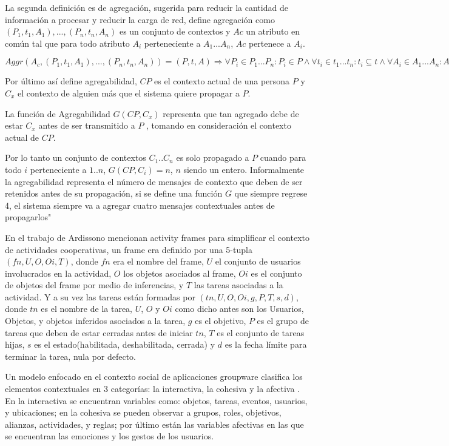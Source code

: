 La segunda definici\'on es de agregaci\'on, sugerida para reducir la cantidad de informaci\'on a procesar y reducir la carga de red, define agregaci\'on como ${ ( P_{1},t_{1},A_{1} ),..., ( P_{n},t_{n},A_{n} ) }$ es un conjunto de contextos y $Ac$ un atributo en com\'un tal que para todo atributo $A_{i}$ perteneciente a $A_{1} ... A_{n}$, $Ac$ pertenece a $A_{i}$.

$Aggr( A_{c}, {( P_{1},t_{1},A_{1} ),..., ( P_{n},t_{n},A_{n} )}) = ( P, t, A )\Rightarrow \forall P_{i}\in P_{1}...P_{n}:P_{i}\in P \wedge \forall t_{i} \in t_{1}...t_{n}:t_{i}\subseteq t \wedge \forall A_{i}\in A_{1}...A_{n}:A_{i}\in A$

Por \'ultimo as\'i define agregabilidad, $CP$ es el contexto actual de una persona $P$ y $C_{x}$ el contexto de alguien m\'as que el sistema quiere propagar a $P$.

La funci\'on de Agregabilidad $G( CP, C_{x} )$ representa que tan agregado debe de estar $C_{x}$ antes de ser transmitido a $P$ , tomando en consideraci\'on el contexto actual de $CP$.

Por lo tanto un conjunto de contextos $C_{1}..C_{n}$ es solo propagado a $P$ cuando para todo $i$ perteneciente a $1..n$, $G( CP, C_{i} ) = n$, $n$ siendo un entero. Informalmente la agregabilidad representa el n\'umero de mensajes de contexto que deben de ser retenidos antes de su propagaci\'on, si se define una funci\'on $G$ que siempre regrese 4, el sistema siempre va a agregar cuatro mensajes contextuales antes de propagarlos"

En el trabajo de Ardissono \cite{ardissono2012context} mencionan activity frames para simplificar el contexto de actividades cooperativas, un frame era definido por una 5-tupla $( fn, U, O, Oi, T )$, donde $fn$ era el nombre del frame, $U$ el conjunto de usuarios involucrados en la actividad, $O$ los objetos asociados al frame, $Oi$ es el conjunto de objetos del frame por medio de inferencias, y $T$ las tareas asociadas a la actividad. Y a su vez las tareas est\'an formadas por $( tn, U, O, Oi, g, P, T, s, d )$, donde $tn$ es el nombre de la tarea, $U$, $O$ y $Oi$ como dicho antes son los Usuarios, Objetos, y objetos inferidos asociados a la tarea, $g$ es el objetivo, $P$ es el grupo de tareas que deben de estar cerradas antes de iniciar $tn$, $T$ es el conjunto de tareas hijas, $s$ es el estado(habilitada, deshabilitada, cerrada) y $d$ es la fecha l\'imite para terminar la tarea, nula por defecto.

Un modelo enfocado en el contexto social de aplicaciones groupware clasifica los elementos contextuales en 3 categor\'ias: la interactiva, la cohesiva y la afectiva \cite{montane2013context}. En la interactiva se encuentran variables como: objetos, tareas, eventos, usuarios, y ubicaciones; en la cohesiva se pueden observar a grupos, roles, objetivos, alianzas, actividades, y reglas; por \'ultimo est\'an las variables afectivas en las que se encuentran las emociones y los gestos de los usuarios.	
